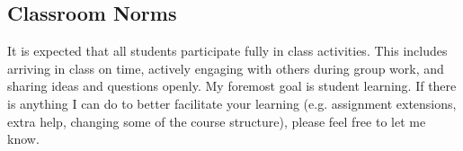 \documentclass[16pt]{article}
\begin{document}
%	
	
	
	
	\subsection*{Classroom Norms}
	It is expected that all students participate fully in class activities. This includes arriving in class on time, actively engaging with others during group work, and sharing ideas and questions openly. My foremost goal is student learning. If there is anything I can do to better facilitate your learning  (e.g. assignment extensions, extra help, changing some of the course structure), please feel free to let me know. 
	
\end{document}
